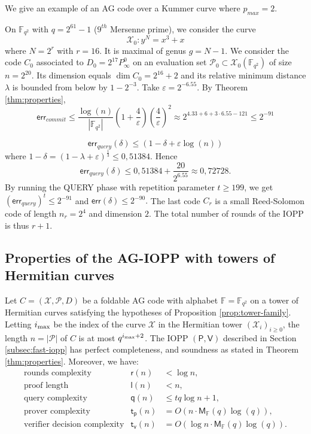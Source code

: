\documentclass[a4paper,USenglish,autoref]{lipics-v2021}
\renewcommand\epsilon{\varepsilon}
\newcommand\F{\mathbb{F}}
\newcommand\prover{\mathsf{P}}
\newcommand\verifier{\mathsf{V}}
\newcommand{\size}[1]{\left|#1\right|}
\newcommand\calX{\mathcal{X}}
\newcommand\calP{\mathcal{P}}
\newcommand{\err}{\textsf{err}}
\newcommand{\cd}{\cdot}
\newcommand{\ii}{i_{\rm{max}}}
\begin{document}
We give an example of an AG code over a Kummer curve where $p_{max} = 2$.

\begin{example} On $\F_{q^2}$ with $q=2^{61}-1$ ($9^{th}$ Mersenne prime), we consider the curve
	\[\calX_0 : y^N=x^3+x\]
	where $N=2^{r}$ with $r=16$. It is maximal \cite{TT14} of genus $g=N-1$. We consider the code $C_0$ associated to $D_0= 2^{17} P_\infty^0$ on an evaluation set $\mathcal{P}_0 \subset \calX_0(\F_{q^2})$ of size $n=2^{20}$. Its dimension equals $\dim C_0=2^{16}+2$ and its relative minimum distance $\lambda$ is bounded from below by $1- 2^{-3}$. Take $\epsilon = 2 ^{-6.55}$. By Theorem \ref{thm:properties},
	\[\err_{commit} \leq \frac{\log(n)}{\size{\F_{q^2}}}\left(1+\frac{4}{\epsilon}\right) \left(\frac{4}{\epsilon}\right)^2 \approx 2^{4.33+6+3\cd 6.55 -121} \leq 2^{-91}\]
	
	
	\[\err_{query}(\delta) \leq \left(1-\delta+ \epsilon\log(n)\right)\]
	where $1-\delta=(1-\lambda + \epsilon)^{\frac{1}{3}} \leq 0,51384$. Hence
	\[\err_{query}(\delta) \leq 0,51384+ \frac{20}{2^{6.55}} \approx 0,72728.\]
	By running the \textsf{QUERY} phase with repetition parameter $t \geq 199$, we get $(\err_{query})^t \leq 2^{-91}$ and $\err(\delta)\leq 2^{-90}.$
	The last code $C_r$ is a small Reed-Solomon code of length $n_r = 2^{4}$ and dimension $2$. The total number of rounds of the IOPP is thus $r + 1$.
\end{example}

\subsection{Properties of the AG-IOPP with towers of Hermitian curves}

\begin{theorem}\label{thm:tower-properties}
	Let $C=(\calX, \calP, D)$ be a foldable AG code with alphabet $\F = \F_{q^2}$ on a tower of Hermitian curves satisfying the hypotheses of Proposition \ref{prop:tower-family}. Letting $\ii$ be the index of the curve $\calX$ in the Hermitian tower $(\calX_i)_{i \ge 0}$, the length $n = \size \calP$ of $C$ is at most $q^{\ii + 2}$. 
	The IOPP $(\prover, \verifier)$ described in Section \ref{subsec:fast-iopp} has perfect completeness, and soundness as stated in Theorem \ref{thm:properties}. Moreover, we have:
	\[
	\begin{array}{lll}
		\text{rounds complexity} &\mathsf{r}(n) &< \log n,\\
		\text{proof length} &\mathsf{l}(n) &< n,\\
		\text{query complexity} &\mathsf{q}(n) &\le t q \log n + 1,
		\\
		\text{prover complexity} &\mathsf{t_p}(n) &= O(n \cdot \mathsf{M}_\F(q)\log(q)),\\
		\text{verifier decision complexity} & \mathsf{t_v}(n) &= O(\log n \cdot\mathsf{M}_\F(q)\log(q)).
	\end{array}
	\]
\end{theorem}
\end{document}
